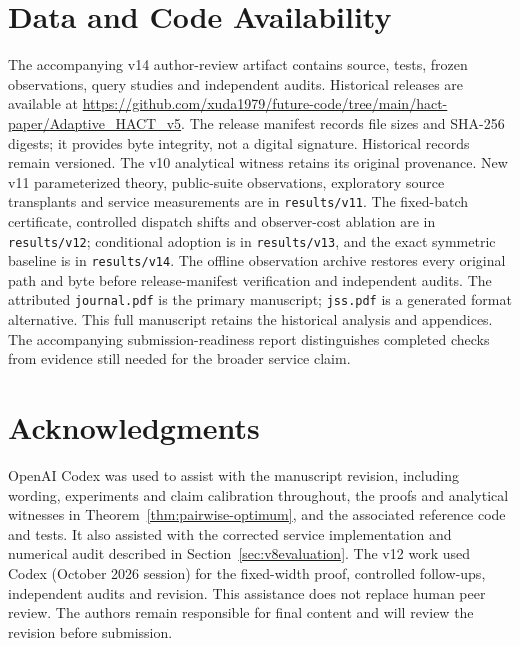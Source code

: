 \section*{Data and Code Availability}
The accompanying v14 author-review artifact contains source, tests, frozen
observations, query studies and independent audits. Historical releases are
available at
\url{https://github.com/xuda1979/future-code/tree/main/hact-paper/Adaptive_HACT_v5}.
The release manifest records file sizes and SHA-256 digests; it provides byte
integrity, not a digital signature. Historical records remain versioned.
The v10 analytical witness retains its original provenance. New v11
parameterized theory, public-suite observations, exploratory source
transplants and service measurements are in \texttt{results/v11}.
The fixed-batch certificate, controlled dispatch shifts and observer-cost
ablation are in \texttt{results/v12}; conditional adoption is in
\texttt{results/v13}, and the exact symmetric baseline is in
\texttt{results/v14}. The offline observation archive restores every original
path and byte before release-manifest verification and independent audits.
The attributed \texttt{journal.pdf} is the primary manuscript;
\texttt{jss.pdf} is a generated format alternative. This full manuscript
retains the historical analysis and appendices.
The accompanying submission-readiness report distinguishes completed checks
from evidence still needed for the broader service claim.

\section*{Acknowledgments}
OpenAI Codex was used to assist with the manuscript revision, including
wording, experiments and claim calibration throughout, the proofs and analytical witnesses in
Theorem~\ref{thm:pairwise-optimum}, and the associated reference code and tests.
It also assisted with the corrected service implementation and numerical
audit described in Section~\ref{sec:v8evaluation}. The v12 work used Codex (October 2026 session) for the fixed-width proof, controlled
follow-ups, independent audits and revision. This assistance does not replace
human peer review. The authors remain responsible for final content and
will review the revision before submission.
